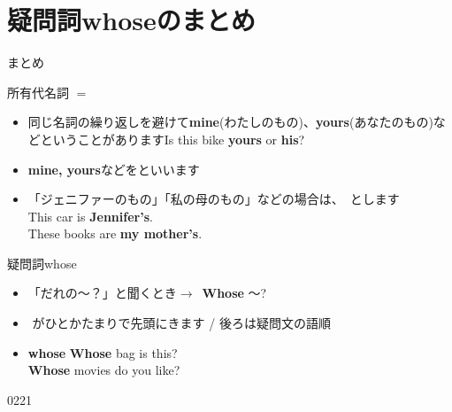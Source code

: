 \documentclass[aspectratio=169,xcolor={dvipsnames,table}]{beamer}
\begin{document}
\section{疑問詞whoseのまとめ}
\begin{frame}[plain]{まとめ}
 \begin{block}{所有代名詞 $=$ }
\begin{itemize}[square]\small
 \item 同じ名詞の繰り返しを避けて\textbf{mine}(わたしのもの)、\textbf{yours}(あなたのもの)などということがあります\hfill{\scriptsize Is this bike {\bfseries yours} or {\bfseries his}?}
 \item \textbf{mine, yours}などをといいます
 \item 「ジェニファーのもの」「私の母のもの」などの場合は、
\,とします\\
\hfill{\scriptsize This car is {\bfseries Jennifer's}.}\\
\hfill{\scriptsize These books are {\bfseries my mother's}.}
\end{itemize}
     \end{block}
\pause
\begin{block}{疑問詞whose }
\begin{itemize}[square]\small
 \item 「だれの～？」と聞くとき$\longrightarrow$\,\,\,{\bfseries Whose} 〜?
 \item  {}\,\,がひとかたまりで先頭にきます / 後ろは疑問文の語順
 \item {\bfseries whose} \hfill{\scriptsize {\bfseries Whose} bag is this?}\\\hfill{\scriptsize {\bfseries Whose} movies do you like?}
\end{itemize}
     \end{block}
\hfill{\tiny 0221}\,{\scriptsize {}}

\end{frame}
\end{document}
